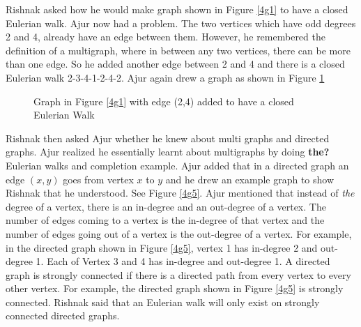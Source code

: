 Rishnak asked how he would make graph shown in Figure \ref{4g1} to have a closed Eulerian walk. Ajur now had a problem. The two vertices which have odd degrees 2 and 4, already have an edge between them. However, he remembered the definition of a multigraph, where in between any two vertices, there can be more than one edge. So he added another edge between 2 and 4 and there is a closed Eulerian walk 2-3-4-1-2-4-2. Ajur again drew a graph as shown in Figure \ref{4g155}
\begin{figure}
\begin{center}
\caption{ Graph in Figure \ref{4g1} with edge (2,4) added to have a closed Eulerian Walk}\label{4g155}
\end{center}
\end{figure}

\vspace{3in}
Rishnak then asked Ajur whether he knew about multi graphs and directed graphs. Ajur realized he essentially learnt about multigraphs  by doing \textbf{the?} Eulerian walks and completion  example. Ajur added that in a directed graph an edge $(x,y)$ goes from vertex $x$ to $y$ and he drew an example graph to show Rishnak that he understood. See Figure \ref{4g5}. 
Ajur mentioned that instead of \emph{the} degree of a vertex, there is an in-degree and an out-degree of a vertex. The number of edges coming to a vertex is the in-degree of that vertex and the number of edges going out of a vertex is the out-degree of a vertex. For example, in the directed graph shown in Figure \ref{4g5}, vertex 1 has in-degree 2 and out-degree 1. Each of Vertex 3 and 4 has in-degree  and out-degree 1. A directed graph is strongly connected if there is a directed path from every vertex to every other vertex. For example, the directed graph shown in Figure \ref{4g5} is strongly connected. Rishnak said that an Eulerian walk will only exist on strongly connected directed graphs.

